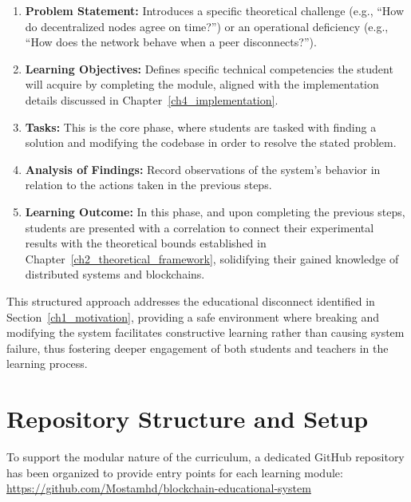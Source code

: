 \begin{enumerate}
    \item \textbf{Problem Statement:} Introduces a specific theoretical challenge (e.g.,  \enquote{How do decentralized nodes agree on time?}) or an operational deficiency (e.g.,  \enquote{How does the network behave when a peer disconnects?}).
    \item \textbf{Learning Objectives:} Defines specific technical competencies the student will acquire by completing the module, aligned with the implementation details discussed in Chapter~\ref{ch4_implementation}.
    \item \textbf{Tasks:} This is the core phase, where students are tasked with finding a solution and modifying the codebase in order to resolve the stated problem.
    \item \textbf{Analysis of Findings:} Record observations of the system's behavior in relation to the actions taken in the previous steps.
    \item \textbf{Learning Outcome:} In this phase, and upon completing the previous steps, students are presented with a correlation to connect their experimental results with the theoretical bounds established in Chapter~\ref{ch2_theoretical_framework}, solidifying their gained knowledge of distributed systems and blockchains.
\end{enumerate}

This structured approach addresses the educational disconnect identified in Section~\ref{ch1_motivation}, providing a safe environment where breaking and modifying the system facilitates constructive learning rather than causing system failure, thus fostering deeper engagement of both students and teachers in the learning process.

\newpage

\section{Repository Structure and Setup} \label{ch5_repo_structure}

To support the modular nature of the curriculum, a dedicated GitHub repository has been organized to provide entry points for each learning module: \url{https://github.com/Mostamhd/blockchain-educational-system} \label{ch5_repo_url}

